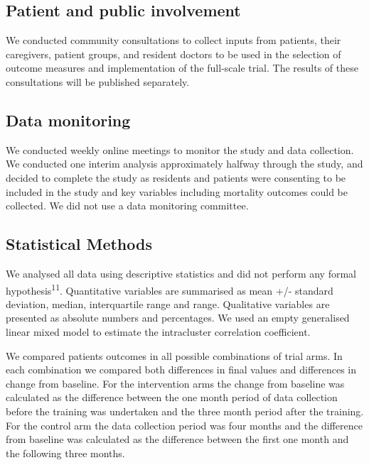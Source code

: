 \documentclass[
]{article}
\begin{document}
\hypertarget{patient-and-public-involvement}{%
\subsection{Patient and public involvement}\label{patient-and-public-involvement}}

We conducted community consultations to collect inputs from patients, their caregivers, patient groups, and resident doctors to be used in the selection of outcome measures and implementation of the full-scale trial. The results of these consultations will be published separately.

\hypertarget{data-monitoring}{%
\subsection{Data monitoring}\label{data-monitoring}}

We conducted weekly online meetings to monitor the study and data collection. We conducted one interim analysis approximately halfway through the study, and decided to complete the study as residents and patients were consenting to be included in the study and key variables including mortality outcomes could be collected. We did not use a data monitoring committee.

\hypertarget{statistical-methods}{%
\subsection{Statistical Methods}\label{statistical-methods}}

We analysed all data using descriptive statistics and did not perform any formal hypothesis\textsuperscript{11}. Quantitative variables are summarised as mean +/- standard deviation, median, interquartile range and range. Qualitative variables are presented as absolute numbers and percentages. We used an empty generalised linear mixed model to estimate the intracluster correlation coefficient.

We compared patients outcomes in all possible combinations of trial arms. In each combination we compared both differences in final values and differences in change from baseline. For the intervention arms the change from baseline was calculated as the difference between the one month period of data collection before the training was undertaken and the three month period after the training. For the control arm the data collection period was four months and the difference from baseline was calculated as the difference between the first one month and the following three months.
\end{document}
